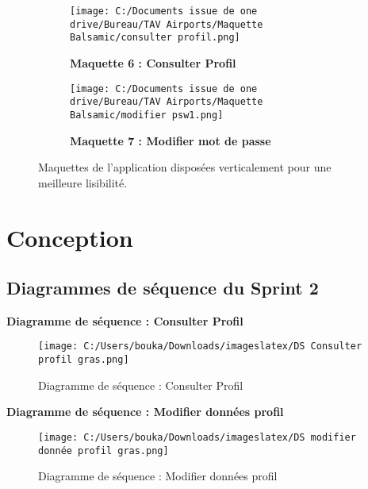 \documentclass[a4paper,11pt]{report}
\begin{document}
\begin{figure}[H]
  \vspace{0.8cm}

  \begin{subfigure}[b]{0.8\textwidth}
    \texttt{[image: C:/Documents issue de one drive/Bureau/TAV Airports/Maquette Balsamic/consulter profil.png]}
    \caption{\textbf{Maquette 6 : Consulter Profil}}
    \label{fig:maquette5}
  \end{subfigure}

  \vspace{0.8cm}
\newpage
  \begin{subfigure}[b]{0.8\textwidth}
    \texttt{[image: C:/Documents issue de one drive/Bureau/TAV Airports/Maquette Balsamic/modifier psw1.png]}
    \caption{\textbf{Maquette 7 : Modifier mot de passe}}
    \label{fig:maquette6}
  \end{subfigure}

  \caption{Maquettes de l’application disposées verticalement pour une meilleure lisibilité.}
  \label{fig:vertical-maquettes}
\end{figure}


\newpage

\section{Conception}
\subsection{Diagrammes de séquence du Sprint 2}

\textbf{Diagramme de séquence : Consulter Profil}
\begin{figure}[htbp]
  \centering
  \texttt{[image: C:/Users/bouka/Downloads/imageslatex/DS Consulter profil gras.png]}
  \caption{Diagramme de séquence : Consulter Profil}
  \label{fig:consulter_profil}
\end{figure}
\newpage
\textbf{Diagramme de séquence : Modifier données profil}
\begin{figure}[htbp]
  \centering
  \texttt{[image: C:/Users/bouka/Downloads/imageslatex/DS modifier donnée profil gras.png]}
  \caption{Diagramme de séquence : Modifier données profil}
  \label{fig:modifier_donnees_profil}
\end{figure}
\end{document}
